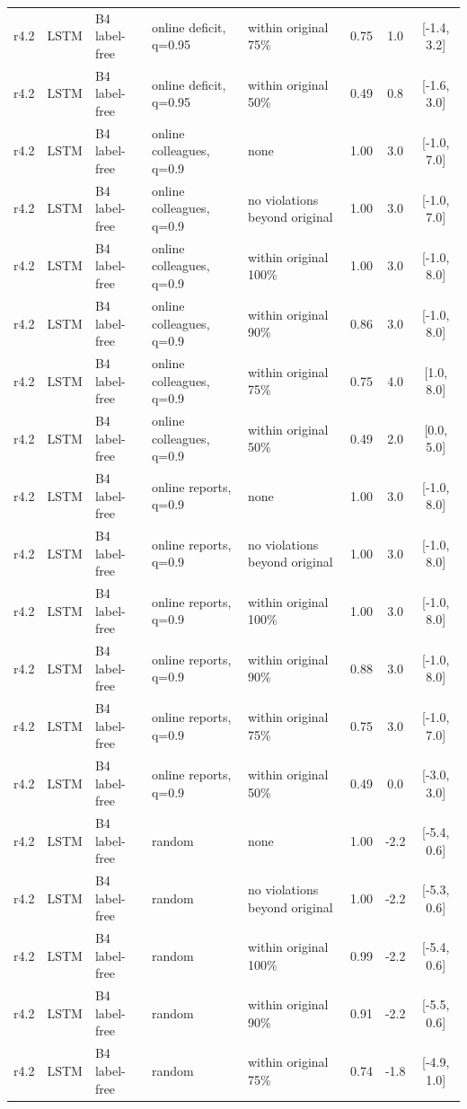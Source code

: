 \documentclass[10pt,onecolumn,letterpaper]{article}
\begin{document}
\begin{longtable}{lllp{4.2cm}p{3.4cm}ccc}
r4.2 & LSTM & B4 label-free & online deficit, q=0.95 & within original 75\% & 0.75 & 1.0 & [-1.4, 3.2] \\
r4.2 & LSTM & B4 label-free & online deficit, q=0.95 & within original 50\% & 0.49 & 0.8 & [-1.6, 3.0] \\
r4.2 & LSTM & B4 label-free & online colleagues, q=0.9 & none & 1.00 & 3.0 & [-1.0, 7.0] \\
r4.2 & LSTM & B4 label-free & online colleagues, q=0.9 & no violations beyond original & 1.00 & 3.0 & [-1.0, 7.0] \\
r4.2 & LSTM & B4 label-free & online colleagues, q=0.9 & within original 100\% & 1.00 & 3.0 & [-1.0, 8.0] \\
r4.2 & LSTM & B4 label-free & online colleagues, q=0.9 & within original 90\% & 0.86 & 3.0 & [-1.0, 8.0] \\
r4.2 & LSTM & B4 label-free & online colleagues, q=0.9 & within original 75\% & 0.75 & 4.0 & [1.0, 8.0] \\
r4.2 & LSTM & B4 label-free & online colleagues, q=0.9 & within original 50\% & 0.49 & 2.0 & [0.0, 5.0] \\
r4.2 & LSTM & B4 label-free & online reports, q=0.9 & none & 1.00 & 3.0 & [-1.0, 8.0] \\
r4.2 & LSTM & B4 label-free & online reports, q=0.9 & no violations beyond original & 1.00 & 3.0 & [-1.0, 8.0] \\
r4.2 & LSTM & B4 label-free & online reports, q=0.9 & within original 100\% & 1.00 & 3.0 & [-1.0, 8.0] \\
r4.2 & LSTM & B4 label-free & online reports, q=0.9 & within original 90\% & 0.88 & 3.0 & [-1.0, 8.0] \\
r4.2 & LSTM & B4 label-free & online reports, q=0.9 & within original 75\% & 0.75 & 3.0 & [-1.0, 7.0] \\
r4.2 & LSTM & B4 label-free & online reports, q=0.9 & within original 50\% & 0.49 & 0.0 & [-3.0, 3.0] \\
r4.2 & LSTM & B4 label-free & random & none & 1.00 & -2.2 & [-5.4, 0.6] \\
r4.2 & LSTM & B4 label-free & random & no violations beyond original & 1.00 & -2.2 & [-5.3, 0.6] \\
r4.2 & LSTM & B4 label-free & random & within original 100\% & 0.99 & -2.2 & [-5.4, 0.6] \\
r4.2 & LSTM & B4 label-free & random & within original 90\% & 0.91 & -2.2 & [-5.5, 0.6] \\
r4.2 & LSTM & B4 label-free & random & within original 75\% & 0.74 & -1.8 & [-4.9, 1.0] \\

\end{longtable}
\end{document}
